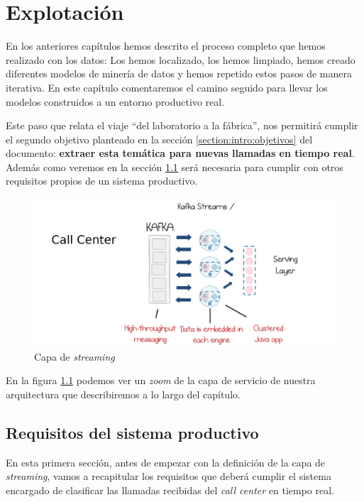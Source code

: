 \chapter{Explotación}
\label{chapter:prod}

En los anteriores capítulos hemos descrito el proceso completo que hemos realizado con los datos: Los hemos localizado, los hemos limpiado, hemos creado diferentes modelos de minería de datos y hemos repetido estos pasos de manera iterativa. En este capítulo comentaremos el camino seguido para llevar los modelos construidos a un entorno productivo real.

Este paso que relata el viaje ``del laboratorio a la fábrica'', nos permitirá  cumplir el segundo objetivo planteado en la sección \ref{section:intro:objetivos} del documento: \textbf{extraer esta temática para nuevas llamadas en tiempo real}. Además como veremos en la sección \ref{section:prod:req} será necesaria para cumplir con otros requisitos propios de un sistema productivo.

\begin{figure}[!ht]
	\centering
	\includegraphics[width=1\textwidth]{images/exp/serving}
	\caption{Capa de \textit{streaming}}
	\label{fig:streamlayer}
\end{figure}


En la figura \ref{fig:streamlayer} podemos ver un \textit{zoom} de la capa de servicio de nuestra arquitectura que describiremos a lo largo del capítulo. 



\section{Requisitos del sistema productivo}
\label{section:prod:req}

En esta primera sección, antes de empezar con la definición de la capa de \textit{streaming}, vamos a recapitular los requisitos que deberá cumplir el sistema encargado de clasificar las llamadas recibidas del \textit{call center} en tiempo real. 

